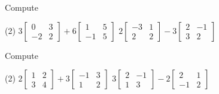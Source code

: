 \documentclass{ximera}
\begin{document}
\begin{exercise}
    Compute
    \begin{tasks}(2)
        \task
        $3\begin{bmatrix}
            0 & 3 \\
            -2 & 2
        \end{bmatrix}
        + 6
        \begin{bmatrix}
            1 & 5 \\
            -1 & 5
        \end{bmatrix}$
        \task
        $2\begin{bmatrix}
            -3 & 1 \\
            2 & 2
        \end{bmatrix}
        - 3
        \begin{bmatrix}
            2 & -1 \\
            3 & 2
        \end{bmatrix}$
    \end{tasks}
\end{exercise}


\begin{exercise}%
    Compute
    \begin{tasks}(2)
        \task
        $2\begin{bmatrix}
            1 & 2 \\
            3 & 4
        \end{bmatrix}
        + 3
        \begin{bmatrix}
            -1 & 3 \\
            1 & 2
        \end{bmatrix}$
        \task
        $3\begin{bmatrix}
            2 & -1 \\
            1 & 3
        \end{bmatrix}
        - 2
        \begin{bmatrix}
            2 & 1 \\
            -1 & 2
        \end{bmatrix}$
    \end{tasks}
\end{exercise}
\end{document}
